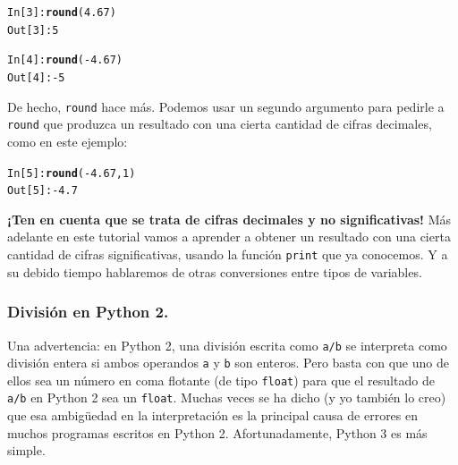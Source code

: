 \documentclass[10pt,a4paper]{article}\usepackage[]{graphicx}\usepackage[]{color}
\makeatletter
\newcommand{\hlnum}[1]{\textcolor[rgb]{0.686,0.059,0.569}{#1}}%
\newcommand{\hlopt}[1]{\textcolor[rgb]{0,0,0}{#1}}%
\newcommand{\hlstd}[1]{\textcolor[rgb]{0.345,0.345,0.345}{#1}}%
\newcommand{\hlkwd}[1]{\textcolor[rgb]{0.737,0.353,0.396}{\textbf{#1}}}%
\newenvironment{kframe}{%
 \def\at@end@of@kframe{}%
 \ifinner\ifhmode%
  \def\at@end@of@kframe{\end{minipage}}%
  \begin{minipage}{\columnwidth}%
 \fi\fi%
 \def\FrameCommand##1{\hskip\@totalleftmargin \hskip-\fboxsep
 \colorbox{shadecolor}{##1}\hskip-\fboxsep
     \hskip-\linewidth \hskip-\@totalleftmargin \hskip\columnwidth}%
 \MakeFramed {\advance\hsize-\width
   \@totalleftmargin\z@ \linewidth\hsize
   \@setminipage}}%
 {\par\unskip\endMakeFramed%
 \at@end@of@kframe}
\newenvironment{knitrout}{}{} %
\makeatother
\begin{document}
\begin{knitrout}
\color{fgcolor}\begin{kframe}
\begin{alltt}
\hlstd{In [}\hlnum{3}\hlstd{]}\hlopt{:} \hlkwd{round}\hlstd{(}\hlnum{4.67}\hlstd{)}
\hlstd{Out[}\hlnum{3}\hlstd{]}\hlopt{:} \hlnum{5}

\hlstd{In [}\hlnum{4}\hlstd{]}\hlopt{:} \hlkwd{round}\hlstd{(}\hlopt{-}\hlnum{4.67}\hlstd{)}
\hlstd{Out[}\hlnum{4}\hlstd{]}\hlopt{: -}\hlnum{5}
\end{alltt}
\end{kframe}
\end{knitrout}
De hecho, {\tt round} hace más. Podemos usar un segundo argumento para pedirle a {\tt round} que produzca un resultado con una cierta cantidad de cifras decimales, como en este ejemplo:
\begin{knitrout}
\color{fgcolor}\begin{kframe}
\begin{alltt}
\hlstd{In [}\hlnum{5}\hlstd{]}\hlopt{:} \hlkwd{round}\hlstd{(}\hlopt{-}\hlnum{4.67}\hlstd{,} \hlnum{1}\hlstd{)}
\hlstd{Out[}\hlnum{5}\hlstd{]}\hlopt{: -}\hlnum{4.7}
\end{alltt}
\end{kframe}
\end{knitrout}
{\bf ¡Ten en cuenta que se trata de cifras decimales y no significativas!} Más adelante en este tutorial vamos a aprender a obtener un resultado con una cierta cantidad de cifras significativas, usando la función {\tt print} que ya conocemos. Y a su debido tiempo hablaremos de otras conversiones entre tipos de variables.

\subsubsection*{División en Python 2.}

Una advertencia: en Python 2, una división escrita como {\tt a/b} se interpreta como división entera si ambos operandos {\tt a} y {\tt b} son enteros. Pero basta con que uno de ellos sea un número en coma flotante (de tipo {\tt float}) para que el resultado de {\tt a/b} en Python 2 sea un {\tt float}. Muchas veces se ha dicho (y yo también lo creo) que esa ambigüedad en la interpretación es la principal causa de errores en muchos programas escritos en Python 2. Afortunadamente, Python 3 es más simple. 
\end{document}
